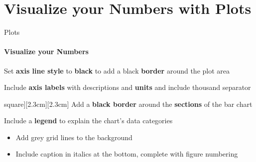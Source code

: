\documentclass[aspectratio=169]{beamer}
\begin{document}
\section{Visualize your Numbers with \textbf{Plots}}

\begin{frame}
\end{frame}

\begin{frame}{Plots}
    \framesubtitle{Visualize your Numbers}

    \vspace{-1.1cm}
    \begin{minipage}[t]{0.49\textwidth}
        \begin{coloredblockleft}
            \footnotesize
            Set \textbf{axis line style} to \textbf{black} to add a black \textbf{border} around the plot area
        \end{coloredblockleft}
        \begin{coloredblockleft}
            \footnotesize
            Include \textbf{axis labels} with descriptions and \textbf{units} and include thousand separator
        \end{coloredblockleft}
        \begin{coloredblockleft}[grey][\large\faIcon[regular]{square}][2.3cm][2.3cm]
            \footnotesize
            Add a \textbf{black border} around the \textbf{sections} of the bar chart
        \end{coloredblockleft}
        \begin{coloredblockleft}
            \footnotesize
            Include a \textbf{legend} to explain the chart's data categories
        \end{coloredblockleft}
        \begin{coloredblock}
                \begin{itemize}
                    \item \footnotesize Add grey grid lines to the background
                    \item \footnotesize Include caption in italics at the bottom, complete with figure numbering

\end{itemize}
\end{coloredblock}
\end{minipage}
\end{frame}
\end{document}
